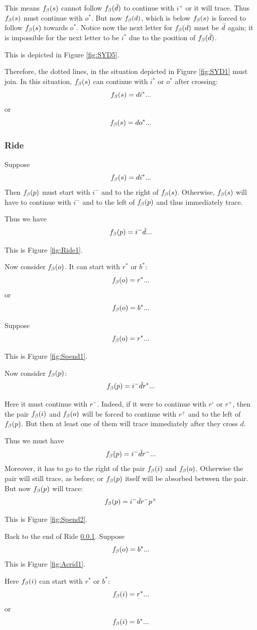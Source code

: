 This means $f_\beta(s)$ cannot follow $f_\beta(\bar{d})$ to continue with $i^+$ or it will trace. Thus $f_\beta(s)$ must continue with $o^*$. But now $f_\beta(d)$, which is below $f_\beta(s)$ is forced to follow $f_\beta(s)$ towards $o^*$. Notice now the next letter for $f_\beta(d)$ must be $\bar{d}$ again; it is impossible for the next letter to be $i^*$ due to the position of $f_\beta(\bar{d})$. 

This is depicted in Figure \ref{fig:SYD5}.

Therefore, the dotted lines, in the situation depicted in Figure \ref{fig:SYD1} must join. In this situation, $f_\beta(s)$ can continue with $i^*$ or $o^*$ after crossing:
\[
f_\beta(s) = d i^*...
\]
or
\[
f_\beta(s) = d o^*...
\]

\subsubsection{Ride}\label{Ride}
Suppose
\[
f_\beta(s) = d i^*...
\]
Then $f_\beta(p)$ must start with $i^-$ and to the right of $f_\beta(s)$. Otherwise, $f_\beta(s)$ will have to continue with $i^-$ and to the left of $f_\beta(p)$ and thus immediately trace.

Thus we have
\[
f_\beta(p)= i^- \bar{d}...
\]


This is Figure \ref{fig:Ride1}.

Now consider $f_\beta(o)$. It can start with $r^*$ or $b^*$:
\[
f_\beta(o) = r^*...
\]
or
\[
f_\beta(o) = b^*...
\]


\label{Spend}
Suppose
\[
f_\beta(o) = r^*...
\]

This is Figure \ref{fig:Spend1}.

Now consider $f_\beta(p)$:
\[
f_\beta(p) = i^- \bar{d} r^*...
\]

Here it must continue with $r^-$. Indeed, if it were to continue with $r^\circ$ or $r^+$, then the pair $f_\beta(i)$ and $f_\beta(o)$ will be forced to continue with $r^+$ and to the left of $f_\beta(p)$. But then at least one of them will trace immediately after they cross $d$. 

Thus we must have
\[
f_\beta(p) = i^- \bar{d} r^-...
\]
Moreover, it has to go to the right of the pair $f_\beta(i)$ and $f_\beta(o)$. Otherwise the pair will still trace, as before; or $f_\beta(p)$ itself will be absorbed between the pair. But now $f_\beta(p)$ will trace:
\[
f_\beta(p) = i^- \bar{d} r^- p^\times
\]

This is Figure \ref{fig:Spend2}.


\label{Acrid}
Back to the end of Ride \ref{Ride}. Suppose
\[
f_\beta(o) = b^*...
\]
This is Figure \ref{fig:Acrid1}.

Here $f_\beta(i)$ can start with $r^*$ or $b^*$:
\[
f_\beta(i) = r^*...
\]
or
\[
f_\beta(i) = b^*...
\]

